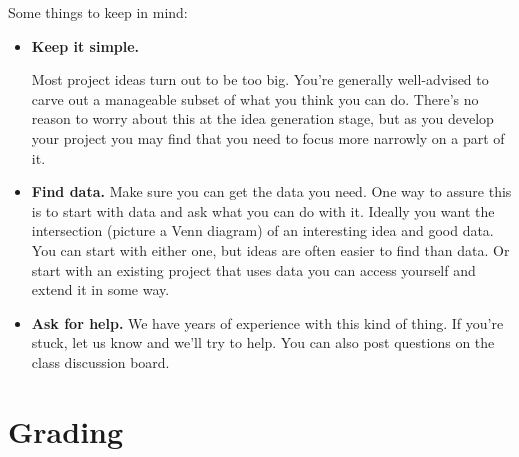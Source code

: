 \documentclass[11pt]{article}
\begin{document}
Some things to keep in mind:
%
\begin{itemize}
      \item {\bf Keep it simple.}

            Most project ideas turn out to be too big.  You're generally well-advised to
            carve out a manageable subset of what you think you can do. There's no reason to
            worry about this at the idea generation stage, but as you develop your project
            you may find that you need to focus more narrowly on a part of it.

      \item {\bf Find data.}  Make sure you can get the data you need. One way to
            assure this is to start with data and ask what you can do with it. Ideally you
            want the intersection (picture a Venn diagram) of an interesting idea and good
            data.  You can start with either one, but ideas are often easier to find than
            data. Or start with an existing project that uses data you can access yourself
            and extend it in some way.


      \item {\bf Ask for help.}
            We have years of experience with this kind of thing. If you're stuck, let us
            know and we'll try to help. You can also post questions on the class discussion
            board.

\end{itemize}


\section*{Grading}
\end{document}
